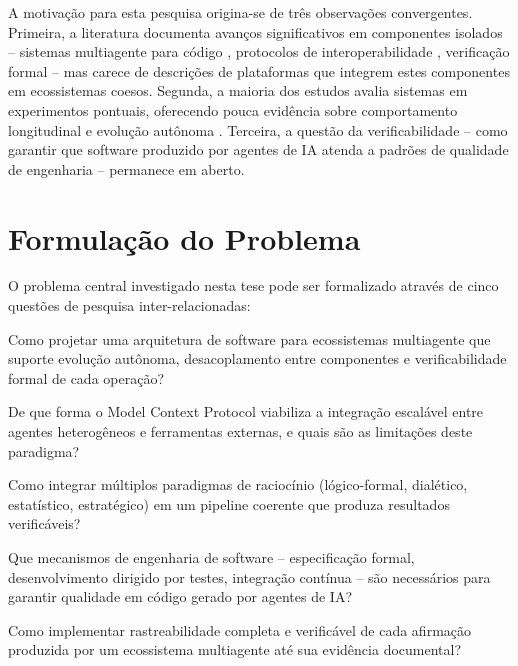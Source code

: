 \documentclass[12pt,a4paper,sumario=tradicional]{abntex2}
\begin{document}
A motivação para esta pesquisa origina-se de três observações convergentes. Primeira, a literatura documenta avanços significativos em componentes isolados -- sistemas multiagente para código \cite{rasheed2026llm}, protocolos de interoperabilidade \cite{lei2026survey}, verificação formal \cite{antero2024harnessing} -- mas carece de descrições de plataformas que integrem estes componentes em ecossistemas coesos. Segunda, a maioria dos estudos avalia sistemas em experimentos pontuais, oferecendo pouca evidência sobre comportamento longitudinal e evolução autônoma \cite{kodumagulla2026engineering}. Terceira, a questão da verificabilidade -- como garantir que software produzido por agentes de IA atenda a padrões de qualidade de engenharia -- permanece em aberto.

\section{Formulação do Problema}

O problema central investigado nesta tese pode ser formalizado através de cinco questões de pesquisa inter-relacionadas:

\begin{description}[style=nextline,leftmargin=2cm]
    \item[QP1 -- Arquitetura:] Como projetar uma arquitetura de software para ecossistemas multiagente que suporte evolução autônoma, desacoplamento entre componentes e verificabilidade formal de cada operação?
    \item[QP2 -- Interoperabilidade:] De que forma o Model Context Protocol viabiliza a integração escalável entre agentes heterogêneos e ferramentas externas, e quais são as limitações deste paradigma?
    \item[QP3 -- Raciocínio:] Como integrar múltiplos paradigmas de raciocínio (lógico-formal, dialético, estatístico, estratégico) em um pipeline coerente que produza resultados verificáveis?
    \item[QP4 -- Qualidade:] Que mecanismos de engenharia de software -- especificação formal, desenvolvimento dirigido por testes, integração contínua -- são necessários para garantir qualidade em código gerado por agentes de IA?
    \item[QP5 -- Auditoria:] Como implementar rastreabilidade completa e verificável de cada afirmação produzida por um ecossistema multiagente até sua evidência documental?
\end{description}
\end{document}
